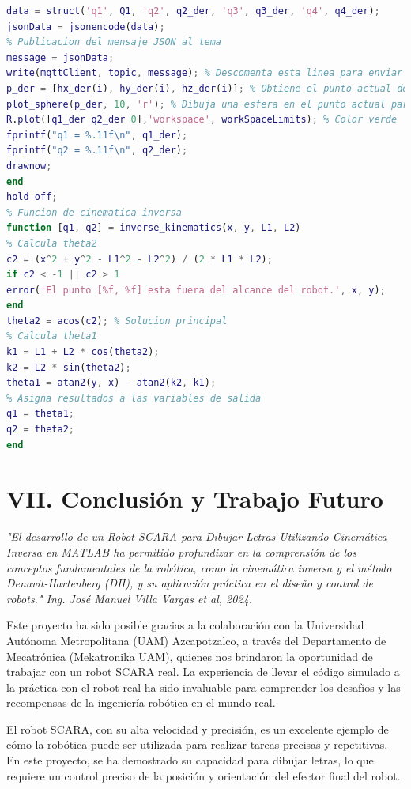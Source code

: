 \documentclass[final]{foresj}
\begin{document}
\begin{lstlisting}[language=Matlab]
% Empaquetamiento datos en estructura JSON
data = struct('q1', Q1, 'q2', q2_der, 'q3', q3_der, 'q4', q4_der);
jsonData = jsonencode(data);
% Publicacion del mensaje JSON al tema
message = jsonData;
write(mqttClient, topic, message); % Descomenta esta linea para enviar el mensaje
p_der = [hx_der(i), hy_der(i), hz_der(i)]; % Obtiene el punto actual de la trayectoria
plot_sphere(p_der, 10, 'r'); % Dibuja una esfera en el punto actual para visualizar la trayectoria (color verde)
R.plot([q1_der q2_der 0],'workspace', workSpaceLimits); % Color verde
fprintf("q1 = %.11f\n", q1_der);
fprintf("q2 = %.11f\n", q2_der);
drawnow;
end
hold off;
% Funcion de cinematica inversa
function [q1, q2] = inverse_kinematics(x, y, L1, L2)
% Calcula theta2
c2 = (x^2 + y^2 - L1^2 - L2^2) / (2 * L1 * L2);
if c2 < -1 || c2 > 1
error('El punto [%f, %f] esta fuera del alcance del robot.', x, y);
end
theta2 = acos(c2); % Solucion principal
% Calcula theta1
k1 = L1 + L2 * cos(theta2);
k2 = L2 * sin(theta2);
theta1 = atan2(y, x) - atan2(k2, k1);
% Asigna resultados a las variables de salida
q1 = theta1;
q2 = theta2;
end
\end{lstlisting}

\section{VII. Conclusión y Trabajo Futuro}

\textit{"El desarrollo de un Robot SCARA para Dibujar Letras Utilizando Cinemática Inversa en MATLAB ha permitido profundizar en la comprensión de los conceptos fundamentales de la robótica, como la cinemática inversa y el método Denavit-Hartenberg (DH), y su aplicación práctica en el diseño y control de robots." Ing. José Manuel Villa Vargas et al, 2024.}

Este proyecto ha sido posible gracias a la colaboración con la Universidad Autónoma Metropolitana (UAM) Azcapotzalco, a través del Departamento de Mecatrónica (Mekatronika UAM), quienes nos brindaron la oportunidad de trabajar con un robot SCARA real. La experiencia de llevar el código simulado a la práctica con el robot real ha sido invaluable para comprender los desafíos y las recompensas de la ingeniería robótica en el mundo real.

El robot SCARA, con su alta velocidad y precisión, es un excelente ejemplo de cómo la robótica puede ser utilizada para realizar tareas precisas y repetitivas. En este proyecto, se ha demostrado su capacidad para dibujar letras, lo que requiere un control preciso de la posición y orientación del efector final del robot.
\end{document}
